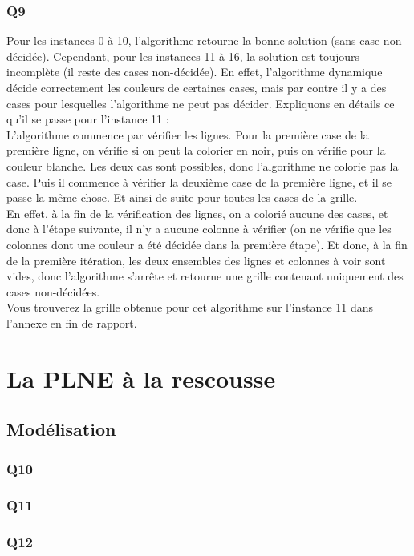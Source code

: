 \documentclass[a4paper]{memoir}
\begin{document}
	\subsubsection{Q9}
	Pour les instances 0 à 10, l'algorithme retourne la bonne solution (sans case non-décidée). Cependant, pour les instances 11 à 16, la solution est toujours incomplète (il reste des cases non-décidée). En effet, l'algorithme dynamique décide correctement les couleurs de certaines cases, mais par contre il y a des cases pour lesquelles l'algorithme ne peut pas décider. Expliquons en détails ce qu'il se passe pour l'instance 11 :\\
	L'algorithme commence par vérifier les lignes. Pour la première case de la première ligne, on vérifie si on peut la colorier en noir, puis on vérifie pour la couleur blanche. Les deux cas sont possibles, donc l'algorithme ne colorie pas la case. Puis il commence à vérifier la deuxième case de la première ligne, et il se passe la même chose. Et ainsi de suite pour toutes les cases de la grille.\\
	En effet, à la fin de la vérification des lignes, on a colorié aucune des cases, et donc à l'étape suivante, il n'y a aucune colonne à vérifier (on ne vérifie que les colonnes dont une couleur a été décidée dans la première étape). Et donc, à la fin de la première itération, les deux ensembles des lignes et colonnes à voir sont vides, donc l'algorithme s'arrête et retourne une grille contenant uniquement des cases non-décidées.\\
	Vous trouverez la grille obtenue pour cet algorithme sur l'instance 11 dans l'annexe en fin de rapport.	
	
	\section{La PLNE à la rescousse}
	\subsection{Modélisation}
	\subsubsection{Q10}
		
	
	\subsubsection{Q11}
	\subsubsection{Q12}
	
\end{document}
